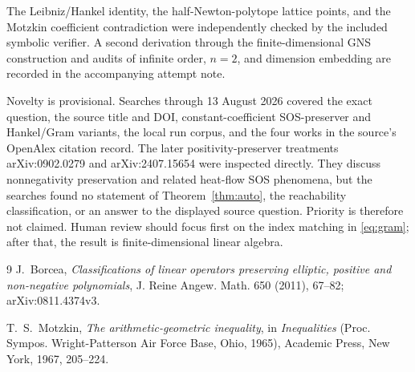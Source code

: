 \documentclass[11pt]{article}
\theoremstyle{remark}
\begin{document}
The Leibniz/Hankel identity, the half-Newton-polytope lattice points, and the
Motzkin coefficient contradiction were independently checked by the included
symbolic verifier.  A second derivation through the finite-dimensional GNS
construction and audits of infinite order, $n=2$, and dimension embedding are
recorded in the accompanying attempt note.

Novelty is provisional.  Searches through 13 August 2026 covered the exact
question, the source title and DOI, constant-coefficient SOS-preserver and
Hankel/Gram variants, the local run corpus, and the four works in the source's
OpenAlex citation record.  The later positivity-preserver treatments
arXiv:0902.0279 and arXiv:2407.15654 were inspected directly.  They discuss
nonnegativity preservation and related heat-flow SOS phenomena, but the
searches found no statement of Theorem~\ref{thm:auto}, the reachability
classification, or an answer to the displayed source question.  Priority is
therefore not claimed.  Human review should focus first on the index matching
in \eqref{eq:gram}; after that, the result is finite-dimensional linear
algebra.

\begin{thebibliography}{9}
J.~Borcea,
\emph{Classifications of linear operators preserving elliptic, positive and
non-negative polynomials}, J. Reine Angew. Math. 650 (2011), 67--82;
arXiv:0811.4374v3.

T.~S.~Motzkin,
\emph{The arithmetic-geometric inequality}, in \emph{Inequalities}
(Proc. Sympos. Wright-Patterson Air Force Base, Ohio, 1965), Academic Press,
New York, 1967, 205--224.
\end{thebibliography}
\end{document}
